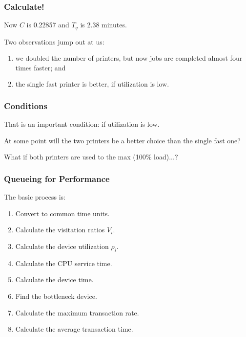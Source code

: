 \begin{frame}
\frametitle{Calculate!}

\large
\begin{changemargin}{1.5cm}
Now $C$ is 0.22857 and $T_{q}$ is 2.38 minutes. 

Two observations jump out at us: \\[0em]
\begin{enumerate}
\item we doubled the number of printers, but now jobs are completed almost four times faster; and 
\item the single fast printer is better, if utilization is low.
\end{enumerate}
\end{changemargin}
\end{frame}



\begin{frame}
\frametitle{Conditions}

\large
\begin{changemargin}{1.5cm}
That is an important condition: if utilization is low. 

At some point will the two printers be a better choice than the single fast one? 

What if both printers are used to the max (100\% load)...?
\end{changemargin}

\end{frame}



\begin{frame}
\frametitle{Queueing for Performance}

\large
\begin{changemargin}{1.5cm}
The basic process is:

\begin{enumerate}
	\item Convert to common time units.
	\item Calculate the visitation ratios $V_{i}$.
	\item Calculate the device utilization $\rho_{i}$.
	\item Calculate the CPU service time.
	\item Calculate the device time.
	\item Find the bottleneck device.
	\item Calculate the maximum transaction rate.
	\item Calculate the average transaction time.
\end{enumerate}
\end{changemargin}
\end{frame}



